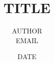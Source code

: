 \documentclass[a4paper,11pt]{article}
\title{TITLE}
\author{AUTHOR \\ EMAIL}
\date{DATE}
\begin{document}
\maketitle

\onehalfspacing

\newpage

\end{document}
